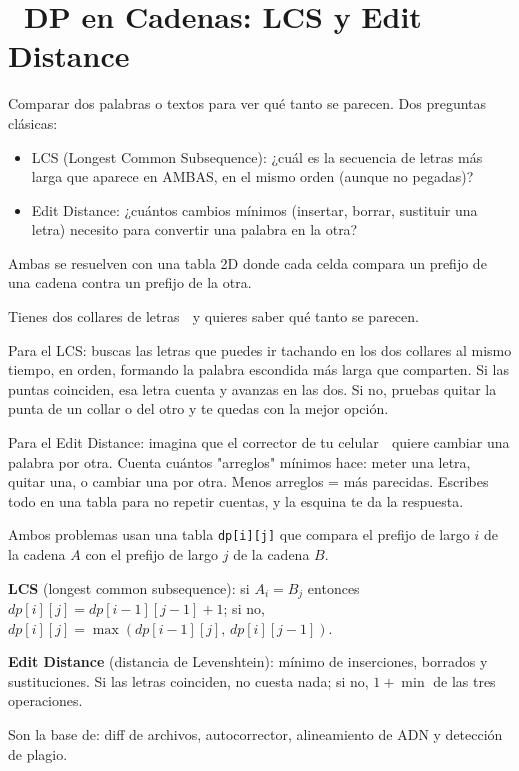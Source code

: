 \chapter[\emj{🔤}~DP en Cadenas: LCS y Edit Distance]{~DP en Cadenas: LCS y Edit Distance}

\begin{dsaquees}

Comparar dos palabras o textos para ver qué tanto se parecen. Dos
preguntas clásicas:

\begin{itemize}
\item LCS (Longest Common Subsequence): ¿cuál es la secuencia de letras
      más larga que aparece en AMBAS, en el mismo orden (aunque no
      pegadas)?
\item Edit Distance: ¿cuántos cambios mínimos (insertar, borrar,
      sustituir una letra) necesito para convertir una palabra en la
      otra?
\end{itemize}

Ambas se resuelven con una tabla 2D donde cada celda compara un prefijo
de una cadena contra un prefijo de la otra.

\end{dsaquees}

\begin{dsanino}

Tienes dos collares de letras 📿 y quieres saber qué tanto se parecen.

Para el LCS: buscas las letras que puedes ir tachando en los dos collares
al mismo tiempo, en orden, formando la palabra escondida más larga que
comparten. Si las puntas coinciden, esa letra cuenta y avanzas en las
dos. Si no, pruebas quitar la punta de un collar o del otro y te quedas
con la mejor opción.

Para el Edit Distance: imagina que el corrector de tu celular 📱 quiere
cambiar una palabra por otra. Cuenta cuántos "arreglos" mínimos hace:
meter una letra, quitar una, o cambiar una por otra. Menos arreglos =
más parecidas. Escribes todo en una tabla para no repetir cuentas, y la
esquina te da la respuesta.

\end{dsanino}

\begin{dsaotraforma}

Ambos problemas usan una tabla \verb|dp[i][j]| que compara el prefijo de
largo $i$ de la cadena $A$ con el prefijo de largo $j$ de la cadena $B$.

\textbf{LCS} (longest common subsequence): si $A_i = B_j$ entonces
$dp[i][j] = dp[i-1][j-1] + 1$; si no, $dp[i][j] = \max(dp[i-1][j],\,
dp[i][j-1])$.

\textbf{Edit Distance} (distancia de Levenshtein): mínimo de inserciones,
borrados y sustituciones. Si las letras coinciden, no cuesta nada; si no,
$1 + \min$ de las tres operaciones.

Son la base de: diff de archivos, autocorrector, alineamiento de ADN y
detección de plagio.

\end{dsaotraforma}


